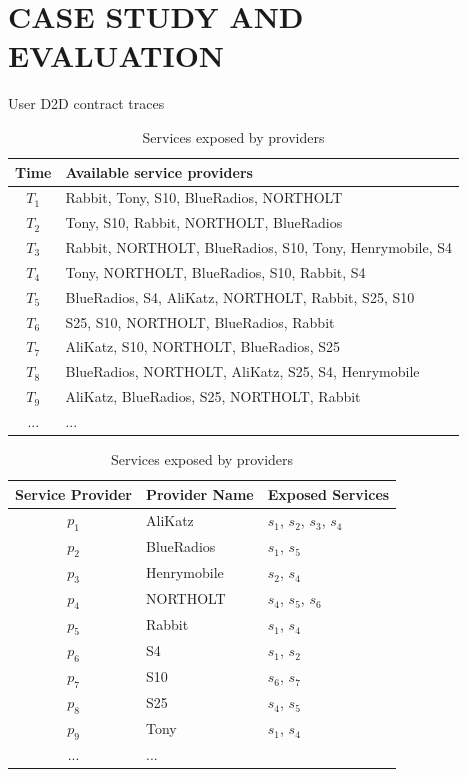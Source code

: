 \documentclass[journal]{IEEEtran}
\begin{document}
\section{CASE STUDY AND EVALUATION}
\begin{table}
\renewcommand{\arraystretch}{1.7}
\parbox{.45\linewidth}{
\caption{User D2D contract traces}
\label{D2D contract traces}
\begin{tabular}{c l}
\hline
\bfseries Time & \bfseries Available service providers\\
\hline
$T_1$ & Rabbit, Tony, S10, BlueRadios, NORTHOLT\\
$T_2$ & Tony, S10, Rabbit, NORTHOLT, BlueRadios\\
$T_3$ & Rabbit, NORTHOLT, BlueRadios, S10, Tony, Henrymobile, S4 \\
$T_4$ & Tony, NORTHOLT, BlueRadios, S10, Rabbit, S4\\
$T_5$ & BlueRadios, S4, AliKatz, NORTHOLT, Rabbit, S25, S10\\
$T_6$ & S25, S10, NORTHOLT, BlueRadios, Rabbit\\
$T_7$ & AliKatz, S10, NORTHOLT, BlueRadios, S25\\
$T_8$ & BlueRadios, NORTHOLT, AliKatz, S25, S4, Henrymobile\\
$T_9$ & AliKatz, BlueRadios, S25, NORTHOLT, Rabbit\\
... & ...\\
\hline
\end{tabular}

}
\hfill
\parbox{.45\linewidth}{
\caption{Services exposed by providers}
\label{Services exposed by providers}
\begin{tabular}{cll}
\hline
\bfseries Service Provider & \bfseries Provider Name  & \bfseries Exposed Services\\
\hline
$p_1$ & AliKatz     & $s_1$, $s_2$, $s_3$, $s_4$\\
$p_2$ & BlueRadios  & $s_1$, $s_5$\\
$p_3$ & Henrymobile & $s_2$, $s_4$\\
$p_4$ & NORTHOLT    & $s_4$, $s_5$, $s_6$ \\
$p_5$ & Rabbit      & $s_1$, $s_4$\\
$p_6$ & S4          & $s_1$, $s_2$\\
$p_7$ & S10         & $s_6$, $s_7$\\
$p_8$ & S25         & $s_4$, $s_5$\\
$p_9$ & Tony        & $s_1$, $s_4$\\
... & ...\\
\hline
\end{tabular}
}
\end{table}
\end{document}
